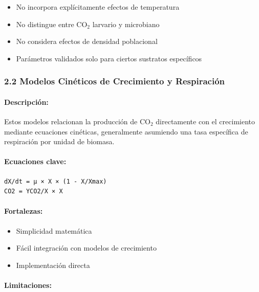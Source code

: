 \documentclass[
]{article}
\providecommand{\tightlist}{%
  \setlength{\itemsep}{0pt}\setlength{\parskip}{0pt}}
\begin{document}
\begin{itemize}
\tightlist
\item
  No incorpora explícitamente efectos de temperatura
\item
  No distingue entre CO$_2$ larvario y microbiano
\item
  No considera efectos de densidad poblacional
\item
  Parámetros validados solo para ciertos sustratos específicos
\end{itemize}

\subsubsection{2.2 Modelos Cinéticos de Crecimiento y
Respiración}\label{modelos-cinuxe9ticos-de-crecimiento-y-respiraciuxf3n}

\paragraph{Descripción:}\label{descripciuxf3n-1}

Estos modelos relacionan la producción de CO$_2$ directamente con el
crecimiento mediante ecuaciones cinéticas, generalmente asumiendo una
tasa específica de respiración por unidad de biomasa.

\paragraph{Ecuaciones clave:}\label{ecuaciones-clave-1}

\begin{verbatim}
dX/dt = μ × X × (1 - X/Xmax)
CO2 = YCO2/X × X
\end{verbatim}

\paragraph{Fortalezas:}\label{fortalezas-1}

\begin{itemize}
\tightlist
\item
  Simplicidad matemática
\item
  Fácil integración con modelos de crecimiento
\item
  Implementación directa
\end{itemize}

\paragraph{Limitaciones:}\label{limitaciones-1}
\end{document}
